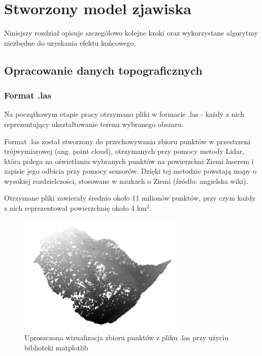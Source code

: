 \chapter{Stworzony model zjawiska}

Niniejszy rozdział opisuje szczegółowo kolejne kroki oraz wykorzystane algorytmy niezbędne do uzyskania efektu końcowego.


\section{Opracowanie danych topograficznych}
\subsection{Format .las}
Na początkowym etapie pracy otrzymano pliki w formacie .las - każdy z nich reprezentujący ukształtowanie terenu wybranego obszaru. 

Format .las został stworzony do przechowywania zbioru punktów w przestrzeni trójwymiarowej (ang. point cloud), otrzymanych przy pomocy metody Lidar, która polega na oświetlaniu wybranych punktów na powierzchni Ziemi laserem i zapisie jego odbicia przy pomocy sensorów. Dzięki tej metodzie powstają mapy o wysokiej rozdzielczości, stosowane w naukach o Ziemi (źródło: angielska wiki). 

Otrzymane pliki zawierały średnio około 11 milionów punktów, przy czym każdy z nich reprezentował powierzchnię około 4 km$^2$.

\begin{figure}[h]
	\includegraphics[width=8cm]{las_example}
	\centering
	\caption{Uproszczona wizualizacja zbioru punktów z pliku .las przy użyciu biblioteki matplotlib}
\end{figure}

